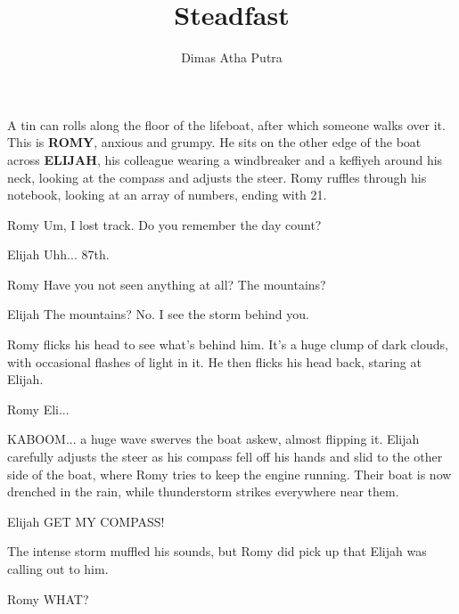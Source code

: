 \documentclass{screenplay}
\title{Steadfast}
\author{Dimas Atha Putra}
\begin{document}
\coverpage


A tin can rolls along the floor of the lifeboat, after which someone walks over it. This is \textbf{ROMY}, anxious and grumpy. He sits on the other edge of the boat across \textbf{ELIJAH}, his colleague wearing a windbreaker and a keffiyeh around his neck, looking at the compass and adjusts the steer. Romy ruffles through his notebook, looking at an array of numbers, ending with 21.

\begin{dialogue}[]{Romy}
    Um, I lost track. Do you remember the day count?
\end{dialogue}

\begin{dialogue}{Elijah}
    Uhh... 87th.
\end{dialogue}

\begin{dialogue}[]{Romy}
    Have you not seen anything at all? The mountains?
\end{dialogue}

\begin{dialogue}[]{Elijah}
    The mountains? No. I see the storm behind you.
\end{dialogue}

Romy flicks his head to see what's behind him. It's a huge clump of dark clouds, with occasional flashes of light in it. He then flicks his head back, staring at Elijah.

\begin{dialogue}{Romy}
    Eli...
\end{dialogue}


KABOOM... a huge wave swerves the boat askew, almost flipping it. Elijah carefully adjusts the steer as his compass fell off his hands and slid to the other side of the boat, where Romy tries to keep the engine running. Their boat is now drenched in the rain, while thunderstorm strikes everywhere near them.

\begin{dialogue}{Elijah}
    GET MY COMPASS!
\end{dialogue}

The intense storm muffled his sounds, but Romy did pick up that Elijah was calling out to him.

\begin{dialogue}{Romy}
    WHAT?
\end{dialogue}
\end{document}
